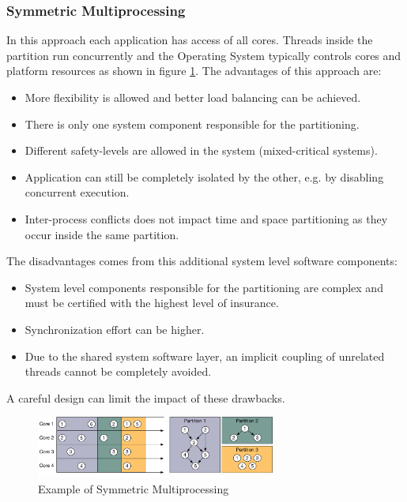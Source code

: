 \subsubsection{Symmetric Multiprocessing}
In this approach each application has access of all cores. Threads inside the partition run concurrently and the Operating System typically controls cores and platform resources as shown in figure \ref{fig:SMP}. The advantages of this approach are:
\begin{itemize}
\item More flexibility is allowed and better load balancing can be achieved.
\item There is only one system component responsible for the partitioning.
\item Different safety-levels are allowed in the system (mixed-critical systems).
\item Application can still be completely isolated by the other, e.g. by disabling concurrent execution.
\item Inter-process conflicts does not impact time and space partitioning as they occur inside the same partition.
\end{itemize}
\par The disadvantages comes from this additional system level software components:
\begin{itemize}
\item System level components responsible for the partitioning are complex and must be certified with the highest level of insurance.
\item Synchronization effort can be higher.
\item Due to the shared system software layer, an implicit coupling of unrelated threads cannot be completely avoided.
\end{itemize}
A careful design can limit the impact of these drawbacks. 

\begin{figure}[htbp]
  \centering
  \includegraphics[width=0.7\textwidth]{SMP}
  \caption{Example of Symmetric Multiprocessing}
  \label{fig:SMP}
\end{figure}


